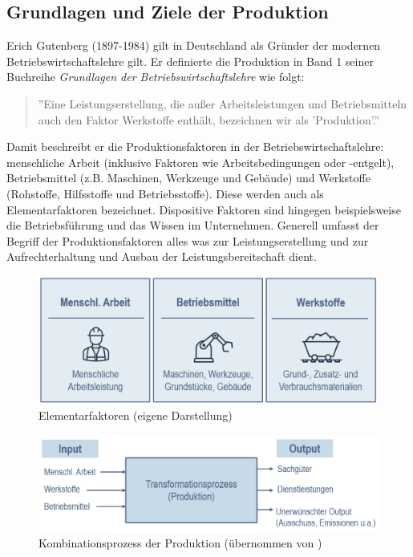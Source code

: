 \documentclass[a4paper,12pt, german]{report}
\begin{document}
\subsection{Grundlagen und Ziele der Produktion}

Erich Gutenberg (1897-1984) gilt in Deutschland als Gründer der modernen Betriebswirtschaftslehre gilt. Er definierte die Produktion in Band 1 seiner Buchreihe \textit{Grundlagen der Betriebswirtschaftslehre} wie folgt:

\begin{quote}
 ''Eine Leistungserstellung, die außer Arbeitsleistungen und Betriebsmitteln auch den Faktor Werkstoffe enthält, bezeichnen wir als 'Produktion'.'' \cite{20}
\end{quote}

Damit beschreibt er die Produktionsfaktoren in der Betriebswirtschaftslehre: menschliche Arbeit (inklusive Faktoren wie Arbeitsbedingungen oder -entgelt), Betriebsmittel (z.B. Maschinen, Werkzeuge und Gebäude) und Werkstoffe (Rohstoffe, Hilfsstoffe und Betriebsstoffe). Diese werden auch als Elementarfaktoren bezeichnet. Dispositive Faktoren sind hingegen beispielsweise die Betriebsführung und das Wissen im Unternehmen. Generell umfasst der Begriff der Produktionsfaktoren alles was zur Leistungserstellung und zur Aufrechterhaltung und Ausbau der Leistungsbereitschaft dient. \cite{06}

\begin{figure}%
  \center
  \includegraphics[width=12cm]{images/Elementarfaktoren.pptx.png}
  \caption[Elementarfaktoren]{Elementarfaktoren (eigene Darstellung)}
\end{figure}

\begin{figure}%
  \center
  \includegraphics[width=12cm]{images/Kombinationsprozess.png}
  \caption[Kombinationsprozess der Produktion]{Kombinationsprozess der Produktion (übernommen von \cite{07}) }
\end{figure}
\end{document}
